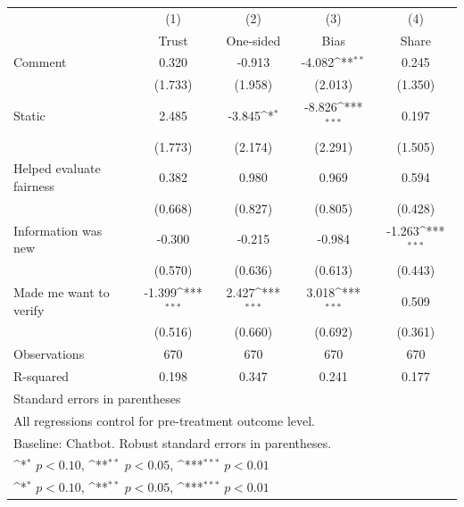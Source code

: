 {
\def\sym#1{\ifmmode^{#1}\else\(^{#1}\)\fi}
\begin{tabular}{l*{4}{c}}
\toprule
                    &\multicolumn{1}{c}{(1)}&\multicolumn{1}{c}{(2)}&\multicolumn{1}{c}{(3)}&\multicolumn{1}{c}{(4)}\\
                    &\multicolumn{1}{c}{Trust}&\multicolumn{1}{c}{One-sided}&\multicolumn{1}{c}{Bias}&\multicolumn{1}{c}{Share}\\
\midrule
Comment             &       0.320         &      -0.913         &      -4.082\sym{**} &       0.245         \\
                    &     (1.733)         &     (1.958)         &     (2.013)         &     (1.350)         \\
\addlinespace
Static              &       2.485         &      -3.845\sym{*}  &      -8.826\sym{***}&       0.197         \\
                    &     (1.773)         &     (2.174)         &     (2.291)         &     (1.505)         \\
\addlinespace
Helped evaluate fairness&       0.382         &       0.980         &       0.969         &       0.594         \\
                    &     (0.668)         &     (0.827)         &     (0.805)         &     (0.428)         \\
\addlinespace
Information was new &      -0.300         &      -0.215         &      -0.984         &      -1.263\sym{***}\\
                    &     (0.570)         &     (0.636)         &     (0.613)         &     (0.443)         \\
\addlinespace
Made me want to verify&      -1.399\sym{***}&       2.427\sym{***}&       3.018\sym{***}&       0.509         \\
                    &     (0.516)         &     (0.660)         &     (0.692)         &     (0.361)         \\
\midrule
Observations        &         670         &         670         &         670         &         670         \\
R-squared           &       0.198         &       0.347         &       0.241         &       0.177         \\
\bottomrule
\multicolumn{5}{l}{\footnotesize Standard errors in parentheses}\\
\multicolumn{5}{l}{\footnotesize All regressions control for pre-treatment outcome level.}\\
\multicolumn{5}{l}{\footnotesize Baseline: Chatbot. Robust standard errors in parentheses.}\\
\multicolumn{5}{l}{\footnotesize \sym{*} \(p<0.10\), \sym{**} \(p<0.05\), \sym{***} \(p<0.01\)}\\
\multicolumn{5}{l}{\footnotesize \sym{*} \(p<0.10\), \sym{**} \(p<0.05\), \sym{***} \(p<0.01\)}\\
\end{tabular}
}

